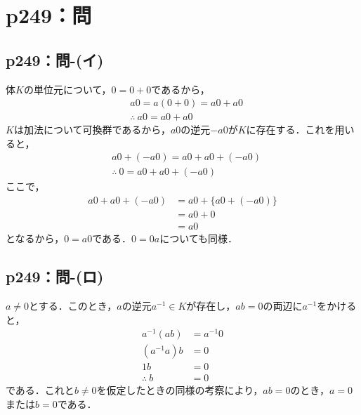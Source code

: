 \section*{p249：問}


\subsection*{p249：問-(イ)}
\begin{tproof}
  体$K$の単位元について，$0=0+0$であるから，
  \begin{align*}
     & a 0=a(0+0)=a0 + a0        \\
     & \therefore ~ a0 = a0 + a0
  \end{align*}
  $K$は加法について可換群であるから，$a0$の逆元$-a0$が$K$に存在する．これを用いると，
  \begin{align*}
     & a0 + (-a0) = a0 + a0 + (-a0)    \\
     & \therefore ~ 0 = a0 + a0 +(-a0)
  \end{align*}
  ここで，
  \begin{align*}
    a0 + a0 +(-a0) & =a0+ \{a0+(-a0)\} \\
                   & = a0 + 0          \\
                   & = a0
  \end{align*}
  となるから，$0=a0$である．$0=0a$についても同様．
\end{tproof}

\subsection*{p249：問-(ロ)}
\begin{tproof}
  $a \ne 0$とする．このとき，$a$の逆元$a^{-1} \in K$が存在し，$ab=0$の両辺に$a^{-1}$をかけると，
  \begin{align*}
    a^{-1} (ab)   & = a^{-1} 0 \\
    (a^{-1}a)b    & =0         \\
    1b            & =0         \\
    \therefore~ b & =0
  \end{align*}
  である．これと$b \ne 0$を仮定したときの同様の考察により，$ab=0$のとき，$a=0$または$b=0$である．
\end{tproof}



